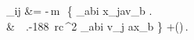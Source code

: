 _{ij} &= -\nu\,m\, \Delta\,\left\{ \epsilon_{ab\langle i}
x_{j\rangle a}v_b \right.\nonumber\\ &~~\left.-{188}
\,{r\over c}\,\gamma^2\,\nu\,\epsilon_{ab\langle i} v_{j\rangle
  a}x_b \right\} +\left(\right)\,.\label{J2}
